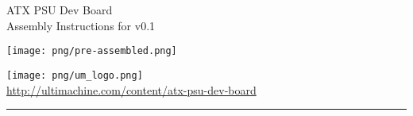 \documentclass{article}
\newcommand{\HRule}[1]{\hfill \rule{0.2\linewidth}{#1}} %
\let\ORIincludegraphics\includegraphics
\renewcommand{\includegraphics}[2][]{\ORIincludegraphics[scale=0.7,#1]{#2}}
\begin{document}
\begin{titlepage}

  {\Huge ATX PSU Dev Board }\\
  {\Large Assembly Instructions for v0.1} 
  \vspace*{\fill}	
  \begin{center}
  \texttt{[image: png/pre-assembled.png]}
  \end{center}
  \vspace*{\fill}

  \vfill
  {\centering \large 
  \hfill \texttt{[image: png/um\_logo.png]} \\
  \hfill \url{http://ultimachine.com/content/atx-psu-dev-board} \\

  \HRule{1pt}} %
\end{titlepage}

\clearpage %

\tableofcontents
\clearpage


\end{document}
